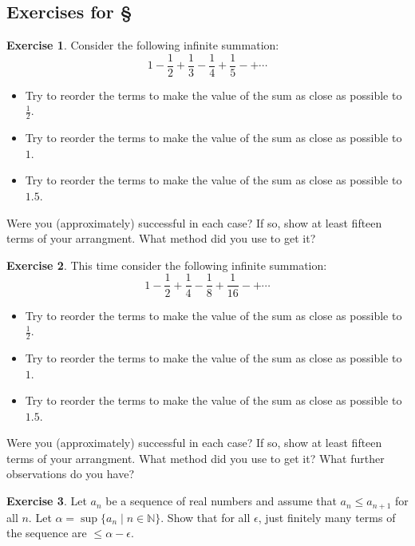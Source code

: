 \documentclass[11pt,oneside]{amsbook}
\newcommand{\set}[1]{\left\{\,#1\,\right\}}
\newcommand{\N}{\mathbb N}
\theoremstyle{definition}
\newtheorem{exerc}{Exercise}[section]
\theoremstyle{plain}
\theoremstyle{definition}
\theoremstyle{remark}
\numberwithin{equation}{section}
\numberwithin{figure}{section}
\begin{document}
\newpage
\subsection*{Exercises for \S \thesection}

\begin{exerc}
  Consider the following infinite summation:
  \[1-\frac12+\frac13-\frac14+\frac15-+\cdots
  \]
  \begin{itemize}
    \item Try to reorder the terms to make the value of the sum as close as possible to $\frac12$.
    \item Try to reorder the terms to make the value of the sum as close as possible to $1$.
    \item Try to reorder the terms to make the value of the sum as close as possible to $1.5$.
  \end{itemize}
  Were you (approximately) successful in each case? If so, show at least fifteen terms of your arrangment. What method did you use to get it?
\end{exerc}

\begin{exerc}
  This time consider the following infinite summation:
  \[1-\frac12+\frac14-\frac18+\frac{1}{16}-+\cdots
  \]
  \begin{itemize}
    \item Try to reorder the terms to make the value of the sum as close as possible to $\frac12$.
    \item Try to reorder the terms to make the value of the sum as close as possible to $1$.
    \item Try to reorder the terms to make the value of the sum as close as possible to $1.5$.
  \end{itemize}
  Were you (approximately) successful in each case? If so, show at least fifteen terms of your arrangment. What method did you use to get it? What further observations do you have?
\end{exerc}


\begin{exerc}
  Let $a_n$ be a sequence of real numbers and assume that $a_n\leq a_{n+1}$ for all $n$. Let $\alpha=\sup\{a_n\mid n\in\N\}$. Show that for all $\epsilon$, just finitely many terms of the sequence are $\leq\alpha-\epsilon$.
\end{exerc}
\end{document}
